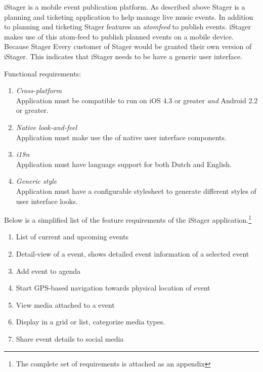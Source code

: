 iStager is a mobile event publication platform. As described above Stager is a planning and ticketing application to help manage live music events. In addition to planning and ticketing Stager features an \emph{atomfeed} to publish events. iStager makes use of this atom-feed to publish planned events on a mobile device. Because Stager
Every customer of Stager would be granted their own version of iStager. This indicates that iStager needs to be have a generic user interface.



Functional requirements:
\begin{enumerate}
\item \emph{Cross-platform}\\Application must be compatible to run on iOS 4.3 or greater \emph{and} Android 2.2 or greater.
\item \emph{Native look-and-feel}\\Application must make use the of native user interface components.
\item \emph{i18n}\\Application must have language support for both Dutch and English.
\item \emph{Generic style}\\Application must have a configurable stylesheet to generate different styles of user interface looks.
\end{enumerate}

\noindent Below is a simplified list of the feature requirements of the iStager application.\footnote{The complete set of requirements is attached as an appendix} %
\begin{enumerate}
\item
List of current and upcoming events
\item
Detail-view of a event, shows detailed event information of a selected event
\item
Add event to agenda
\item
Start GPS-based navigation towards physical location of event
\item
View media attached to a event
\item
Display in a grid or list, categorize media types.
\item
Share event details to social media
\end{enumerate}

